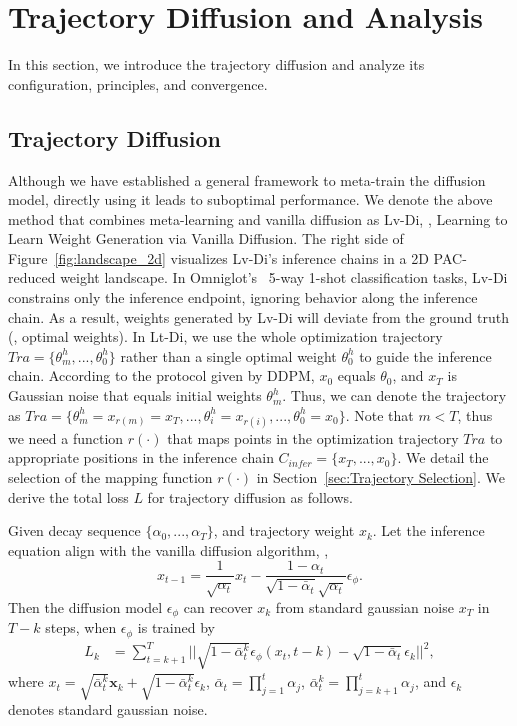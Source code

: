 \section{Trajectory Diffusion and Analysis}\label{sec:trajectory overall}
In this section, we introduce the trajectory diffusion and analyze its configuration, principles, and convergence.
\subsection{Trajectory Diffusion}\label{sec:trajectory diffusion}
Although we have established a general framework to meta-train the diffusion model, directly using it leads to suboptimal performance. We denote the above method that combines meta-learning and vanilla diffusion as Lv-Di, \ie, Learning to Learn Weight Generation via Vanilla Diffusion. The right side of Figure~\ref{fig:landscape_2d} visualizes Lv-Di’s inference chains in a 2D PAC-reduced weight landscape. In Omniglot's~\cite{omniglot} 5-way 1-shot classification tasks, Lv-Di constrains only the inference endpoint, ignoring behavior along the inference chain. As a result, weights generated by Lv-Di will deviate from the ground truth (\ie, optimal weights). In Lt-Di, we use the whole optimization trajectory $Tra=\{\theta^h_m, ... ,\theta^h_0\}$ rather than a single optimal weight $\theta^h_0$ to guide the inference chain. According to the protocol given by DDPM, $x_0$ equals $\theta_0$, and $x_T$ is Gaussian noise that equals initial weights $\theta^h_m$. Thus, we can denote the trajectory as $Tra=\{\theta^h_m=x_{r(m)}=x_T,...,\theta^h_i=x_{r(i)},..., \theta^h_0=x_0\}$. Note that $m < T$, thus we need a function $r(\cdot)$ that maps points in the optimization trajectory $Tra$ to appropriate positions in the inference chain $C_{infer}=\{x_T,...,x_0\}$. We detail the selection of the mapping function $r(\cdot)$ in Section~\ref{sec:Trajectory Selection}. We derive the total loss $L$ for trajectory diffusion as follows.

\begin{theorem}\label{the:L_k}
Given decay sequence $\{\alpha_0,...,\alpha_T\}$, and trajectory weight $x_k$. Let the inference equation align with the vanilla diffusion algorithm, \ie, 
\begin{equation}
x_{t-1}=\frac{1}{\sqrt{\alpha_t}}x_t - \frac{1 - \alpha_t}{\sqrt{1 - \bar{\alpha}_t} \sqrt{\alpha_t}}\epsilon_{\phi}.
\end{equation}
Then the diffusion model $\epsilon_{\phi}$ can recover $x_k$ from standard gaussian noise $x_T$ in $T-k$ steps, when $\epsilon_{\phi}$ is trained by
\begin{align*}
L_k&=\sum_{t=k+1}^T||\sqrt{1-\bar{\alpha}_t^k}\epsilon_{\phi}(x_t, t-k)-\sqrt{1-\bar{\alpha}_t}\epsilon_k||^2,
\end{align*}
where $x_t=\sqrt{\bar{\alpha}^k_t} \mathbf{x}_k + \sqrt{1 - \bar{\alpha}^k_t}\epsilon_k$, $\bar{\alpha}_t=\prod_{j=1}^t \alpha_j$,  $\bar{\alpha}^k_t=\prod_{j=k+1}^t \alpha_j$, and $\epsilon_k$ denotes standard gaussian noise.
\end{theorem}


